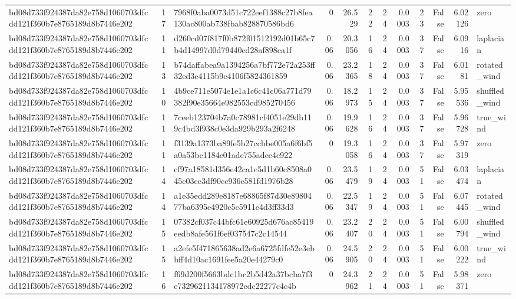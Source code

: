 \begin{tabular}{lrlrrrrrrrrl}
bd08d733f924387da82e758d1060703dfcdd121f360b7e8765189d8b7446e202 & 17 & 7968f0aba0073d51c722eef1388c27b8fea130ac800ab738fbab828870586bd6 & 0 & 26.529 & 22 & 24 & 0.0003 & 23 & False & 6.02126 & zero \\
bd08d733f924387da82e758d1060703dfcdd121f360b7e8765189d8b7446e202 & 11 & d260cd07f817f0b872f01512192d01b65c7b4d14997d0d79440ed28af898ca1f & 0.06 & 20.3056 & 16 & 24 & 0.0003 & 37 & False & 6.0916 & laplacian \\
bd08d733f924387da82e758d1060703dfcdd121f360b7e8765189d8b7446e202 & 13 & b74daffabea9a1394256a7bf772e72a253ff32ed3e4115b9c4106f5824361859 & 0.06 & 23.2365 & 18 & 24 & 0.0003 & 37 & False & 6.0181 & rotated\_wind \\
bd08d733f924387da82e758d1060703dfcdd121f360b7e8765189d8b7446e202 & 10 & 4b9ce711e5074e1e1a1c6c41c06a771d79382f90e35664e982553cd985270456 & 0.06 & 18.2973 & 15 & 24 & 0.0003 & 37 & False & 5.95536 & shuffled\_wind \\
bd08d733f924387da82e758d1060703dfcdd121f360b7e8765189d8b7446e202 & 11 & 7ceeb123704b7a0c78981cf4051e29db119c4bd3f938c0e3da929b293a2f6248 & 0.06 & 19.9628 & 16 & 24 & 0.0003 & 37 & False & 5.96728 & true\_wind \\
bd08d733f924387da82e758d1060703dfcdd121f360b7e8765189d8b7446e202 & 11 & f3139a1373ba89fe5b27ccbbe005a6f6bf5a0a53bc1184e01ade755adee4c922 & 0 & 19.3058 & 16 & 24 & 0.0003 & 37 & False & 5.97319 & zero \\
bd08d733f924387da82e758d1060703dfcdd121f360b7e8765189d8b7446e202 & 14 & cf97a18581d356e42ca1e5d1b60c8508a045c03ec3df90cc936e581fd1976b28 & 0.06 & 23.5479 & 19 & 24 & 0.0003 & 51 & False & 6.03474 & laplacian \\
bd08d733f924387da82e758d1060703dfcdd121f360b7e8765189d8b7446e202 & 14 & a1e35edd289e8187e68865f87d30e8980477ba6395e4920c5c5911e4d3ff33d3 & 0.06 & 22.5347 & 19 & 24 & 0.0003 & 51 & False & 6.07445 & rotated\_wind \\
bd08d733f924387da82e758d1060703dfcdd121f360b7e8765189d8b7446e202 & 15 & 07382cf037c44bfc61e60925d676ac85419eedb8afe561f6ef037547c2c14544 & 0.06 & 23.2407 & 20 & 24 & 0.0003 & 51 & False & 6.00794 & shuffled\_wind \\
bd08d733f924387da82e758d1060703dfcdd121f360b7e8765189d8b7446e202 & 15 & a2efe5f471865638ad2e6a6725fdfe52e3ebbff4d10ac1691fee5a20e44279c0 & 0.06 & 24.5905 & 20 & 24 & 0.0003 & 51 & False & 6.00222 & true\_wind \\
bd08d733f924387da82e758d1060703dfcdd121f360b7e8765189d8b7446e202 & 16 & f69d200f5663bdc1bc2b5d42a37bcba7f3e7329621134178972cdc22277c4c4b & 0 & 24.3962 & 21 & 24 & 0.0003 & 51 & False & 5.98371 & zero \\

\end{tabular}
